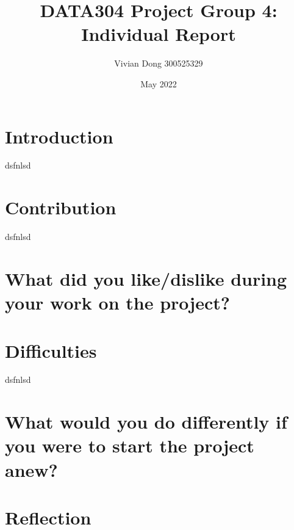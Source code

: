\documentclass{article}
\title{\Huge DATA304 Project Group 4:\\
  \Huge Individual Report}
\author{\Large Vivian Dong 300525329}
\date{\Large May 2022}
\begin{document}
\maketitle

\section{Introduction}
dsfnlsd

\section{Contribution}
dsfnlsd

\section{What did you like/dislike during your work on the project?}

\section{Difficulties}
dsfnlsd

\section{What would you do differently if you were to start the project anew?}

\section{Reflection}
\end{document}
